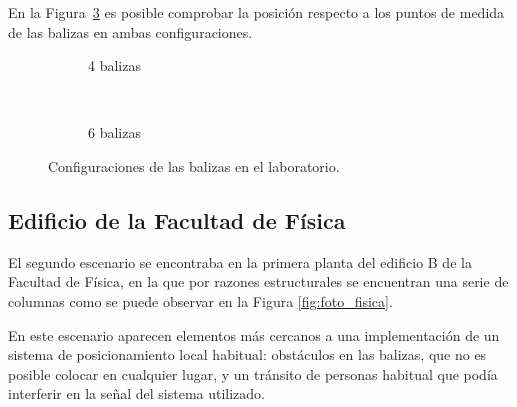 En la Figura~\ref{fig:lab_sensores} es posible comprobar la posición respecto a los puntos de medida de las balizas en ambas configuraciones.

\begin{figure}[H]
  \begin{subfigure}[b]{.5\textwidth}
    \centering
    \def\svgwidth{0.7\linewidth}
     
    \caption{4 balizas}
    \label{fig:lab_4sens}
  \end{subfigure}
  \ \
  \begin{subfigure}[b]{.5\textwidth}
    \centering
    \def\svgwidth{0.82\linewidth}
      
    \caption{6 balizas}
    \label{fig:lab_6sens}
  \end{subfigure}
  \caption{Configuraciones de las balizas en el laboratorio.}
  \label{fig:lab_sensores}
\end{figure}

\subsection{Edificio de la Facultad de Física}

El segundo escenario se encontraba en la primera planta del edificio B de la Facultad de Física, en la que por razones estructurales se encuentran una serie de columnas como se puede observar en la Figura \ref{fig:foto_fisica}.

En este escenario aparecen elementos más cercanos a una implementación de un sistema de posicionamiento local habitual: obstáculos en las balizas, que no es posible colocar en cualquier lugar, y un tránsito de personas habitual que podía interferir en la señal del sistema utilizado.

